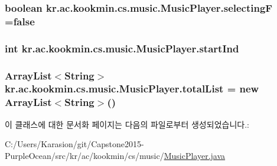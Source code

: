 \subsubsection[{selecting\+F}]{\setlength{\rightskip}{0pt plus 5cm}boolean kr.\+ac.\+kookmin.\+cs.\+music.\+Music\+Player.\+selecting\+F =false}\label{classkr_1_1ac_1_1kookmin_1_1cs_1_1music_1_1_music_player_a84e908ec2c02aac3801492aed4d1ae8a}
\hypertarget{classkr_1_1ac_1_1kookmin_1_1cs_1_1music_1_1_music_player_af154b8f09fc298427ccfb1d0e7c94447}{}
\subsubsection[{start\+Ind}]{\setlength{\rightskip}{0pt plus 5cm}int kr.\+ac.\+kookmin.\+cs.\+music.\+Music\+Player.\+start\+Ind\hspace{0.3cm}{\ttfamily [private]}}\label{classkr_1_1ac_1_1kookmin_1_1cs_1_1music_1_1_music_player_af154b8f09fc298427ccfb1d0e7c94447}
\hypertarget{classkr_1_1ac_1_1kookmin_1_1cs_1_1music_1_1_music_player_ac7599b9b64999c9fcb1b7f1e6d32d188}{}
\subsubsection[{total\+List}]{\setlength{\rightskip}{0pt plus 5cm}Array\+List$<$String$>$ kr.\+ac.\+kookmin.\+cs.\+music.\+Music\+Player.\+total\+List = new Array\+List$<$String$>$()\hspace{0.3cm}{\ttfamily [private]}}\label{classkr_1_1ac_1_1kookmin_1_1cs_1_1music_1_1_music_player_ac7599b9b64999c9fcb1b7f1e6d32d188}


이 클래스에 대한 문서화 페이지는 다음의 파일로부터 생성되었습니다.\+:\begin{DoxyCompactItemize}
\item 
C\+:/\+Users/\+Karasion/git/\+Capstone2015-\/\+Purple\+Ocean/src/kr/ac/kookmin/cs/music/\hyperlink{_music_player_8java}{Music\+Player.\+java}\end{DoxyCompactItemize}
